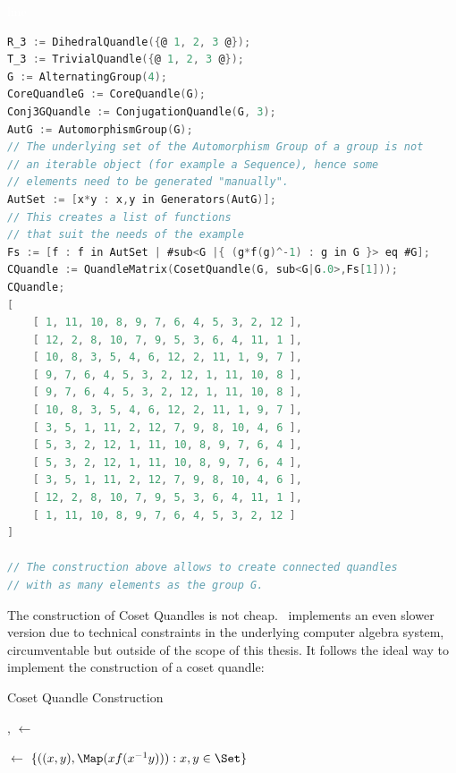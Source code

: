 \begin{example}\textcolor{white}{line}\newline
\begin{lstlisting}[language=C]
R_3 := DihedralQuandle({@ 1, 2, 3 @});
T_3 := TrivialQuandle({@ 1, 2, 3 @});
G := AlternatingGroup(4);
CoreQuandleG := CoreQuandle(G);
Conj3GQuandle := ConjugationQuandle(G, 3);
AutG := AutomorphismGroup(G);
// The underlying set of the Automorphism Group of a group is not 
// an iterable object (for example a Sequence), hence some
// elements need to be generated "manually".
AutSet := [x*y : x,y in Generators(AutG)];
// This creates a list of functions 
// that suit the needs of the example
Fs := [f : f in AutSet | #sub<G |{ (g*f(g)^-1) : g in G }> eq #G]; 
CQuandle := QuandleMatrix(CosetQuandle(G, sub<G|G.0>,Fs[1]));
CQuandle;
[
    [ 1, 11, 10, 8, 9, 7, 6, 4, 5, 3, 2, 12 ],
    [ 12, 2, 8, 10, 7, 9, 5, 3, 6, 4, 11, 1 ],
    [ 10, 8, 3, 5, 4, 6, 12, 2, 11, 1, 9, 7 ],
    [ 9, 7, 6, 4, 5, 3, 2, 12, 1, 11, 10, 8 ],
    [ 9, 7, 6, 4, 5, 3, 2, 12, 1, 11, 10, 8 ],
    [ 10, 8, 3, 5, 4, 6, 12, 2, 11, 1, 9, 7 ],
    [ 3, 5, 1, 11, 2, 12, 7, 9, 8, 10, 4, 6 ],
    [ 5, 3, 2, 12, 1, 11, 10, 8, 9, 7, 6, 4 ],
    [ 5, 3, 2, 12, 1, 11, 10, 8, 9, 7, 6, 4 ],
    [ 3, 5, 1, 11, 2, 12, 7, 9, 8, 10, 4, 6 ],
    [ 12, 2, 8, 10, 7, 9, 5, 3, 6, 4, 11, 1 ],
    [ 1, 11, 10, 8, 9, 7, 6, 4, 5, 3, 2, 12 ]
]

// The construction above allows to create connected quandles 
// with as many elements as the group G.
\end{lstlisting}
The construction of Coset Quandles is not cheap. \Software~implements an even slower version due to technical constraints in the underlying computer algebra system, circumventable but outside of the scope of this thesis. \newline It follows the ideal way to implement the construction of a coset quandle: \newline

\begin{algorithm}[H]
\caption{Coset Quandle Construction}\label{alg:coset}
\DontPrintSemicolon
{}
\BlankLine
\BlankLine
{}
\Set, \Map $\leftarrow$ \;

\Graph $\leftarrow$ $\{((x,y), \Map(xf(x^{-1}y))) : x,y \in \Set\}$\;
\end{algorithm}

\end{example}

